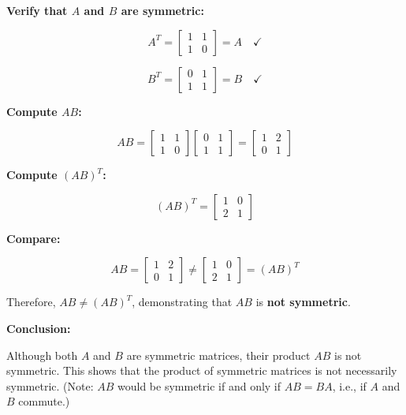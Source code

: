 \textbf{Verify that $A$ and $B$ are symmetric:}

\[
A^T = \begin{bmatrix} 1 & 1 \\ 1 & 0 \end{bmatrix} = A \quad \checkmark
\]

\[
B^T = \begin{bmatrix} 0 & 1 \\ 1 & 1 \end{bmatrix} = B \quad \checkmark
\]

\textbf{Compute $AB$:}

\[
AB = \begin{bmatrix} 1 & 1 \\ 1 & 0 \end{bmatrix} \begin{bmatrix} 0 & 1 \\ 1 & 1 \end{bmatrix} = \begin{bmatrix} 1 & 2 \\ 0 & 1 \end{bmatrix}
\]

\textbf{Compute $(AB)^T$:}

\[
(AB)^T = \begin{bmatrix} 1 & 0 \\ 2 & 1 \end{bmatrix}
\]

\textbf{Compare:}

\[
AB = \begin{bmatrix} 1 & 2 \\ 0 & 1 \end{bmatrix} \neq \begin{bmatrix} 1 & 0 \\ 2 & 1 \end{bmatrix} = (AB)^T
\]

Therefore, $AB \neq (AB)^T$, demonstrating that $AB$ is \textbf{not symmetric}.

\textbf{Conclusion:}

Although both $A$ and $B$ are symmetric matrices, their product $AB$ is not symmetric. This shows that the product of symmetric matrices is not necessarily symmetric. (Note: $AB$ would be symmetric if and only if $AB = BA$, i.e., if $A$ and $B$ commute.)
